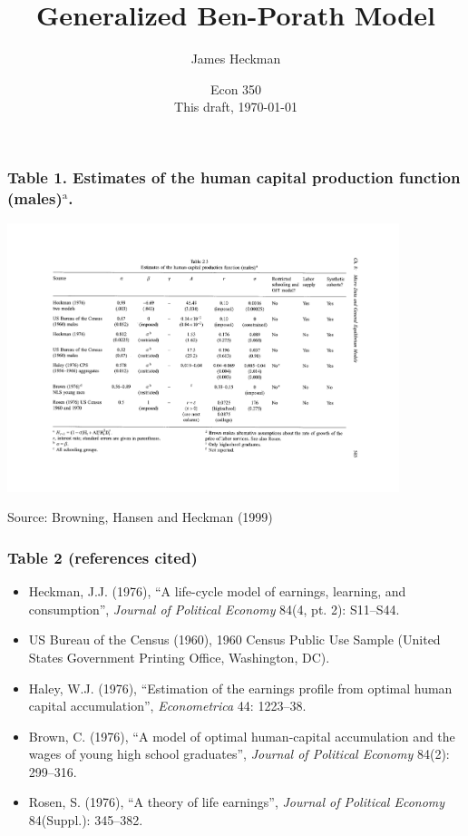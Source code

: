 \documentclass[12pt,compress,handout]{beamer}  %
\begin{document}
\title{Generalized Ben-Porath Model}

\author{James Heckman}

\date{Econ 350 \\
This draft, \today}


\frame{\titlepage}


\begin{frame}[plain]
\frametitle{Table 1. Estimates of the human capital production
function (males)$^{\text{a}}$.}
\begin{center}
\includegraphics[width=4.5in]{include/tab-bbh-est-hum-cap.pdf}

{\footnotesize Source: Browning, Hansen and Heckman (1999)}
\end{center}
\end{frame}


\begin{frame}
\frametitle{Table 2 (references cited)}
\begin{itemize}[<+->]
\item Heckman, J.J. (1976), ``A life-cycle model of earnings, learning, and consumption'', \emph{Journal of Political
Economy} 84(4, pt. 2): S11--S44.

\item US Bureau of the Census (1960), 1960 Census Public Use Sample (United States Government Printing
Office, Washington, DC).

\item Haley, W.J. (1976), ``Estimation of the earnings profile from optimal human capital accumulation'',
\emph{Econometrica} 44: 1223--38.

\item Brown, C. (1976), ``A model of optimal human-capital accumulation and the wages of young high school
graduates'', \emph{Journal of Political Economy} 84(2): 299--316.

\item Rosen, S. (1976), ``A theory of life earnings'', \emph{Journal of Political Economy} 84(Suppl.): 345--382.
\end{itemize}
\end{frame}
\end{document}
